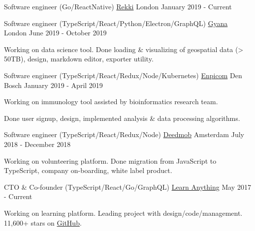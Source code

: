 
\begin{cventries}

  \cventry
    {Software engineer (Go/ReactNative)}
    {\href{https://www.rekki.com}{Rekki}}
    {London}
    {January 2019 - Current}
     {
    }

  \cventry
    {Software engineer (TypeScript/React/Python/Electron/GraphQL)}
    {\href{https://www.gyana.co.uk}{Gyana}}
    {London}
    {June 2019 - October 2019}
     {
      \begin{cvitems}
        \item {Working on data science tool. Done loading \& visualizing of geospatial data (> 50TB), design, markdown editor, exporter utility.}
      \end{cvitems}
    }

  \cventry
    {Software engineer (TypeScript/React/Redux/Node/Kubernetes)}
    {\href{https://www.enpicom.com}{Enpicom}}
    {Den Bosch}
    {January 2019 - April 2019}
     {
      \begin{cvitems}
        \item {Working on immunology tool assisted by bioinformatics research team.}
        \item {Done user signup, design, implemented analysis \& data processing algorithms.}
      \end{cvitems}
    }

  \cventry
    {Software engineer (TypeScript/React/Redux/Node)}
    {\href{https://www.deedmob.com}{Deedmob}}
    {Amsterdam}
    {July 2018 - December 2018}
     {
      \begin{cvitems}
        \item {Working on volunteering platform. Done migration from JavaScript to TypeScript, company on-boarding, white label product.}
      \end{cvitems}
    }

  \cventry
    {CTO \& Co-founder (TypeScript/React/Go/GraphQL)}
    {\href{https://learn-anything.xyz}{Learn Anything}}
    {}
    {May 2017 - Current}
     {
      \begin{cvitems}
        \item {Working on learning platform. Leading project with design/code/management. 11,600+ stars on \href{https://github.com/learn-anything/learn-anything}{GitHub}.}
      \end{cvitems}
    }

\end{cventries}
